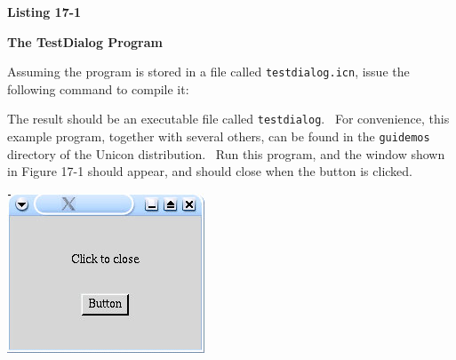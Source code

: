 {\sffamily\bfseries
Listing 17-1}

{\sffamily\bfseries
The TestDialog Program}



\noindent Assuming the program is stored in a file called
\texttt{testdialog.icn},
issue the following command to compile it:


The result should be an executable file called \texttt{testdialog}.
\ For convenience, this example program, together with several others,
can be found in the \texttt{guidemos} directory of the Unicon
distribution. \ Run this program, and the window shown in Figure 17-1
should appear, and should close when the button is
clicked.

\begin{center}
\includegraphics[width=2.3126in,height=1.8752in]{ub-img/ub-img50.jpg}
\end{center}

